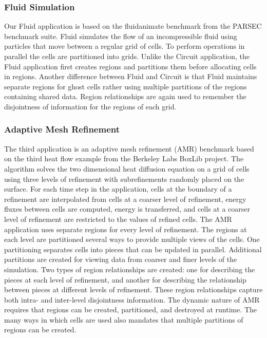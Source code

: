 \subsubsection{Fluid Simulation}
\label{subsec:fluid}
Our Fluid application is based on the fluidanimate benchmark from the PARSEC benchmark
suite\cite{bienia11benchmarking}.  Fluid simulates the flow of an incompressible fluid
using particles that move between a regular grid of cells.  To perform operations in 
parallel the cells are partitioned into grids.  Unlike
the Circuit application, the Fluid application first creates regions and partitions them before
allocating cells in regions.  Another difference between Fluid and Circuit is that Fluid
maintains separate regions for ghost cells rather using multiple partitions of
the regions containing shared data.  Region relationships are again used to remember
the disjointness of information for the regions of each grid.

\subsubsection{Adaptive Mesh Refinement}
\label{subsec:amr}
The third application is an adaptive mesh refinement (AMR) benchmark based on the third heat flow
example from the Berkeley Labs BoxLib project\cite{BoxLib}.  The algorithm solves the two
dimensional heat diffusion equation on a grid of cells using three levels of refinement with subrefinements
randomly placed on the surface.  For each time step in the application, cells at the boundary of
a refinement are interpolated from cells at a coarser level of refinement, energy fluxes between
cells are computed, energy is transferred, and cells at a coarser level of refinement are restricted
to the values of refined cells.  The AMR application uses separate regions for every level of
refinement.  The regions at each level are partitioned several ways to provide multiple views of
the cells.  One partitioning separates cells into pieces that can be updated in
parallel.  Additional partitions are created for viewing data from coarser and finer levels of
the simulation.  Two types of region relationships are created: one for describing the pieces at 
each level of refinement, and another for describing the relationship between pieces at different
levels of refinement.  These region relationships capture both intra- and inter-level disjointness
information.  The dynamic nature of AMR requires that regions can be created, partitioned,
and destroyed at runtime.  The many ways in which cells are used also mandates that multiple
partitions of regions can be created.

